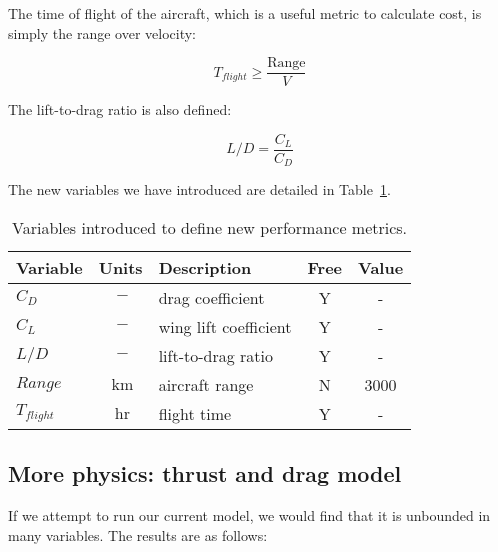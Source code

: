 The time of flight of the aircraft, which is a useful metric to calculate cost, is simply the range over velocity:

\begin{equation}
    T_{flight} \geq \frac{\mathrm{Range}}{V}
\end{equation}

The lift-to-drag ratio is also defined: 

\begin{equation}
    L/D = \frac{C_L}{C_D}    
\end{equation}

The new variables we have introduced are detailed in Table~\ref{tab:vars_perfMetrics}.

\begin{footnotesize}
\begin{table}
    \centering
    \begin{tabular}{ l c l c c }
        \toprule
        Variable & Units & Description & Free & Value \\
        \midrule
        $C_D$ & $~\mathrm{-}$ & drag coefficient & Y & - \\
        $C_L$ & $~\mathrm{-}$ & wing lift coefficient & Y & - \\
        $L/D$ & $~\mathrm{-}$ & lift-to-drag ratio & Y & - \\
        $Range$ & $~\mathrm{km}$ & aircraft range & N & 3000 \\
        $T_{flight}$ & $~\mathrm{hr}$ & flight time & Y & - \\
        \bottomrule
    \end{tabular}
    \caption{Variables introduced to define new performance metrics.}
    \label{tab:vars_perfMetrics}
\end{table} \end{footnotesize}

\subsection{More physics: thrust and drag model}

If we attempt to run our current model, we would find that it is unbounded in many variables.
The results are as follows:

